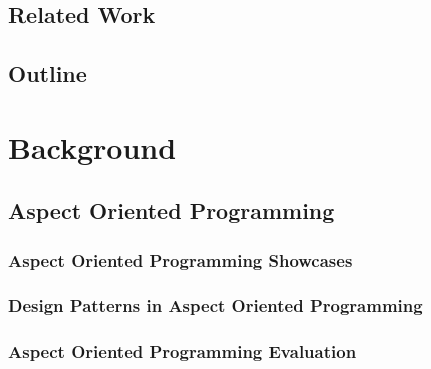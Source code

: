 \documentclass{uvamscse}
\begin{document}
\section{Related Work}\label{Related Work}

\section{Outline}\label{Outline}

\chapter{Background}\label{Background}

\section{Aspect Oriented Programming}\label{Aspect Oriented Programming}

\subsection{Aspect Oriented Programming Showcases}\label{Aspect Oriented Programming Showcases}

\subsection{Design Patterns in Aspect Oriented Programming}\label{Design Patterns in Aspect Oriented Programming}

\subsection{Aspect Oriented Programming Evaluation}\label{Aspect Oriented Programming Evaluation}

\end{document}
